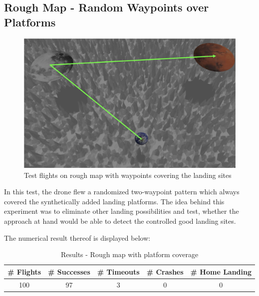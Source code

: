    \subsection{Rough Map - Random Waypoints over Platforms}\label{subsec:rough_coverage}
        \begin{figure}[h]
            \centering
            \includegraphics[scale=0.24]{images/evaluation/rough_over_platforms.png}
            \caption{Test flights on rough map with waypoints covering the landing sites}
            \label{fig:rough_covered}
        \end{figure}

        In this test, the drone flew a randomized two-waypoint pattern which always covered the synthetically added landing platforms. The idea behind this experiment was to eliminate other landing possibilities and test, whether the approach at hand would be able to detect the controlled good landing sites.

        The numerical result thereof is displayed below:

        \begin{table}[h]
            \begin{center}
             \caption{Results - Rough map with platform coverage}\vspace{1ex}
             \label{tab:result_rough_covered}
             \begin{tabular}{|c|c|c|c|c|}
             \hline
             \# Flights & \# Successes & \# Timeouts & \# Crashes & \# Home Landing\\ \hline \hline
             100 & 97 & 3 & 0 & 0 \\%
             \hline
             \end{tabular}
            \end{center}
        \end{table}

